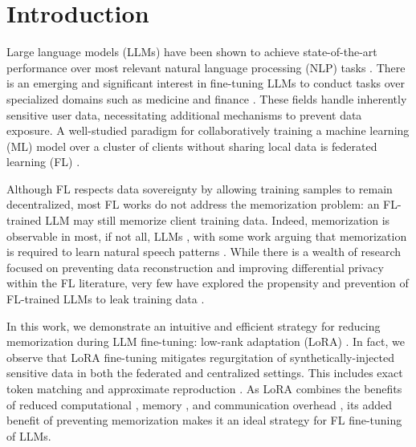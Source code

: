 \section{Introduction}
\label{introduction}
Large language models (LLMs) have been shown to achieve state-of-the-art performance over most relevant natural language processing (NLP) tasks \citep{zhao2023survey}. There is an emerging and significant interest in fine-tuning LLMs to conduct tasks over specialized domains such as medicine \citep{thirunavukarasu2023large, yang2022large} and finance \citep{wu2023bloomberggpt, li2023large}. These fields handle inherently sensitive user data, necessitating additional mechanisms to prevent data exposure. A well-studied paradigm for collaboratively training a machine learning (ML) model over a cluster of clients without sharing local data is federated learning (FL) \citep{mcmahan2016fedavg, kairouz2021advances}. 

Although FL respects data sovereignty by allowing training samples to remain decentralized, most FL works do not address the memorization problem: an FL-trained LLM may still memorize client training data. Indeed, memorization is observable in most, if not all, LLMs \citep{carlini2019secret, carlini2022quantifying, carlini2021extracting}, with some work arguing that memorization is required to learn natural speech patterns \citep{dourish2004we, feldman2020does}. While there is a wealth of research focused on preventing data reconstruction \citep{huang2021evaluating} and improving differential privacy \citep{el2022differential} within the FL literature, very few have explored the propensity and prevention of FL-trained LLMs to leak training data \citep{thakkar2020understanding}. 

In this work, we demonstrate an intuitive and efficient strategy for reducing memorization during LLM fine-tuning: low-rank adaptation (LoRA) \citep{hu2021lora}. In fact, we observe that LoRA fine-tuning mitigates regurgitation of synthetically-injected sensitive data in both the federated and centralized settings. This includes exact token matching \citep{carlini2022quantifying} and approximate reproduction \citep{ippolito2023verbatim}. As LoRA combines the benefits of reduced computational \citep{hu2021lora}, memory \citep{dettmers2024qlora}, and communication overhead \citep{liu2024differentially}, its added benefit of preventing memorization makes it an ideal strategy for FL fine-tuning of LLMs. 

